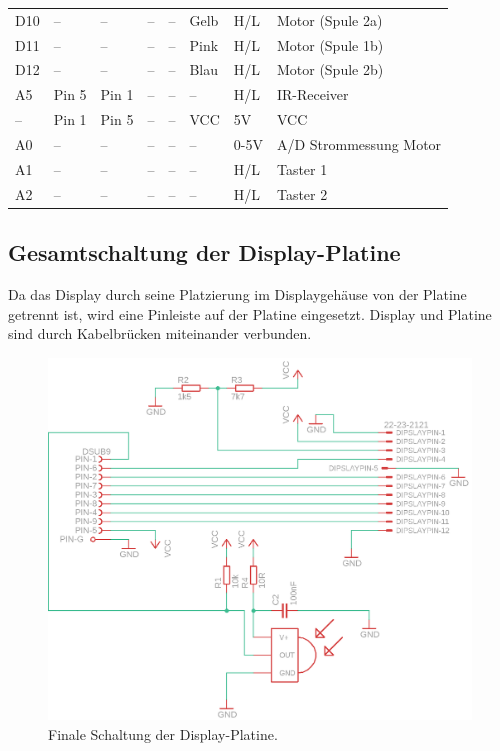 \documentclass[11pt, titlepage, fleqn]{report}
\begin{document}
\begin{table}[htbp]
\begin{tabular}{llllllll}
						D10		&--			&--		& --		& --		& Gelb		& H/L	& Motor (Spule 2a)\\
						D11		&--			&--		& --		& --		& Pink		& H/L	& Motor (Spule 1b)\\
						D12		&--			&--		& --		& --		& Blau		& H/L	& Motor (Spule 2b)\\
						A5		& Pin 5		& Pin 1	& --		& --		& --		& H/L	& IR-Receiver\\
						--		& Pin 1		& Pin 5	& --		& --		& VCC		& 5V	& VCC\\
						A0		& --		&--		& --		& --		& --		& 0-5V	& A/D Strommessung Motor\\
						A1		& --		&--		& --		& --		& --		& H/L	& Taster 1\\
						A2		& --		&--		& --		& --		& --		& H/L	& Taster 2\\
	
					\end{tabular}
				\end{table}
				\newpage
			\subsection{Gesamtschaltung der Display-Platine}
				Da das Display durch seine Platzierung im Displaygehäuse von der Platine getrennt ist, wird eine Pinleiste auf der Platine eingesetzt. Display und Platine sind durch Kabelbrücken miteinander verbunden.
				\vspace{3em}
				\begin{figure}[htbp]
					\centering
					\includegraphics[width=\linewidth]{./img/DisplayComplete.png}
					\caption{Finale Schaltung der Display-Platine.
					\label{fig:imgDPComp}}			
				\end{figure}
				\newpage
\end{document}
